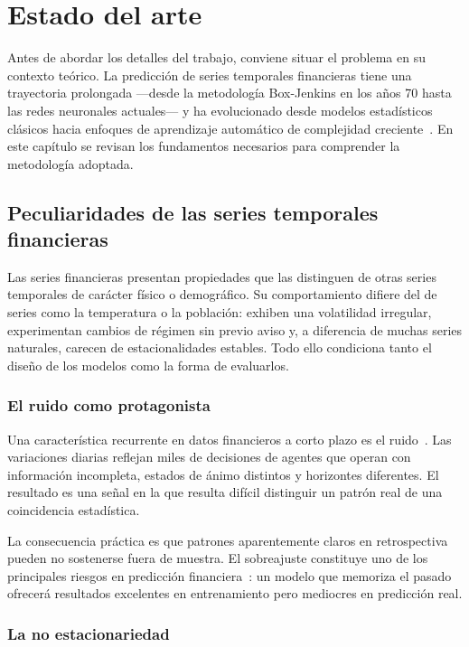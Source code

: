 \chapter{Estado del arte}
\label{ch:arte}

Antes de abordar los detalles del trabajo, conviene situar el problema en su contexto teórico. La predicción de series temporales financieras tiene una trayectoria prolongada ---desde la metodología Box-Jenkins en los años 70 hasta las redes neuronales actuales--- y ha evolucionado desde modelos estadísticos clásicos hacia enfoques de aprendizaje automático de complejidad creciente~\cite{sezer2020financial}. En este capítulo se revisan los fundamentos necesarios para comprender la metodología adoptada.

\section{Peculiaridades de las series temporales financieras}

Las series financieras presentan propiedades que las distinguen de otras series temporales de carácter físico o demográfico. Su comportamiento difiere del de series como la temperatura o la población: exhiben una volatilidad irregular, experimentan cambios de régimen sin previo aviso y, a diferencia de muchas series naturales, carecen de estacionalidades estables. Todo ello condiciona tanto el diseño de los modelos como la forma de evaluarlos.

\subsection{El ruido como protagonista}

Una característica recurrente en datos financieros a corto plazo es el ruido~\cite{cont2001empirical}. Las variaciones diarias reflejan miles de decisiones de agentes que operan con información incompleta, estados de ánimo distintos y horizontes diferentes. El resultado es una señal en la que resulta difícil distinguir un patrón real de una coincidencia estadística.

La consecuencia práctica es que patrones aparentemente claros en retrospectiva pueden no sostenerse fuera de muestra. El sobreajuste constituye uno de los principales riesgos en predicción financiera~\cite{sezer2020financial}: un modelo que memoriza el pasado ofrecerá resultados excelentes en entrenamiento pero mediocres en predicción real.

\subsection{La no estacionariedad}

